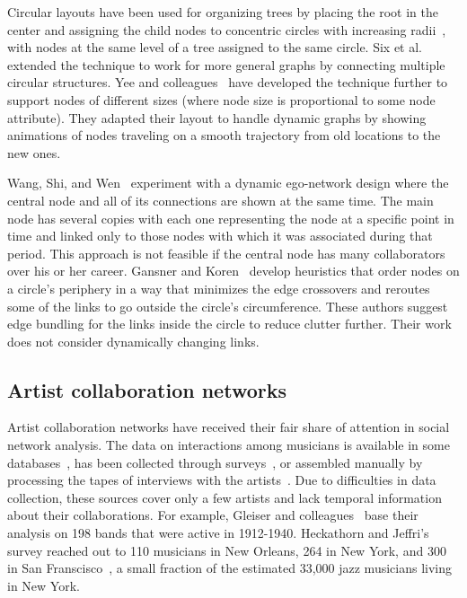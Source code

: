 \documentclass[12pt]{cmuthesis}
\begin{document}
  Circular layouts have been used for organizing trees by placing the root in the center and assigning the child nodes to concentric circles with increasing radii~\cite{North1997}, with nodes at the same level of a tree assigned to the same circle. Six et al.~\cite{Six1999} extended the technique to work for more general graphs by connecting multiple circular structures. Yee and colleagues~\cite{Yee2001} have developed the technique further to support nodes of different sizes (where node size is proportional to some node attribute). They adapted their layout to handle dynamic graphs by showing animations of nodes traveling on a smooth trajectory from old locations to the new ones.

  Wang, Shi, and Wen~\cite{Wang2011a} experiment with a dynamic ego-network design where the central node and all of its connections are shown at the same time. The main node has several copies with each one representing the node at a specific point in time and linked only to those nodes with which it was associated during that period. This approach is not feasible if the central node has many collaborators over his or her career. Gansner and Koren~\cite{Gansner2006} develop heuristics that order nodes on a circle's periphery in a way that minimizes the edge crossovers and reroutes some of the links to go outside the circle's circumference. These authors suggest edge bundling for the links inside the circle to reduce clutter further. Their work does not consider dynamically changing links.

  \subsection{Artist collaboration networks}

  Artist collaboration networks have received their fair share of attention in social network analysis. The data on interactions among musicians is available in some databases~\cite{Gleiser2003,Pattuelli2012}, has been collected through surveys~\cite{Heckathorn2001a}, or assembled manually by processing the tapes of interviews with the artists~\cite{Pattuelli2011}. Due to difficulties in data collection, these sources cover only a few artists and lack temporal information about their collaborations. For example, Gleiser and colleagues~\cite{Gleiser2003} base their analysis on 198 bands that were active in 1912-1940. Heckathorn and Jeffri's survey reached out to 110 musicians in New Orleans, 264 in New York, and 300 in San Franscisco~\cite{Heckathorn2001a}, a small fraction of the estimated 33,000 jazz musicians living in New York.
\end{document}
